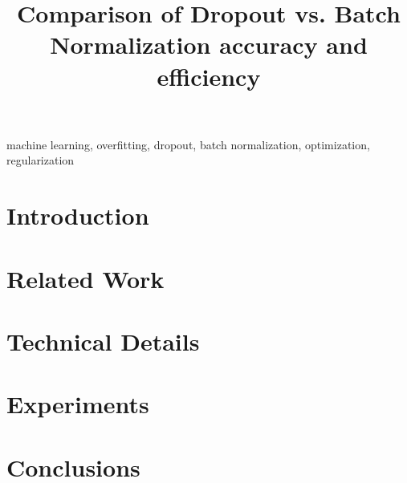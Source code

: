 \documentclass[conference]{IEEEtran}
\begin{document}
\title{Comparison of Dropout vs. Batch Normalization accuracy and efficiency}

\author{
}

\maketitle

\begin{abstract}

\end{abstract}

\begin{IEEEkeywords}
machine learning, overfitting, dropout, batch normalization, optimization, regularization
\end{IEEEkeywords}

\section{Introduction}


\section{Related Work}


\section{Technical Details}


\section{Experiments}


\section{Conclusions}

\end{document}

